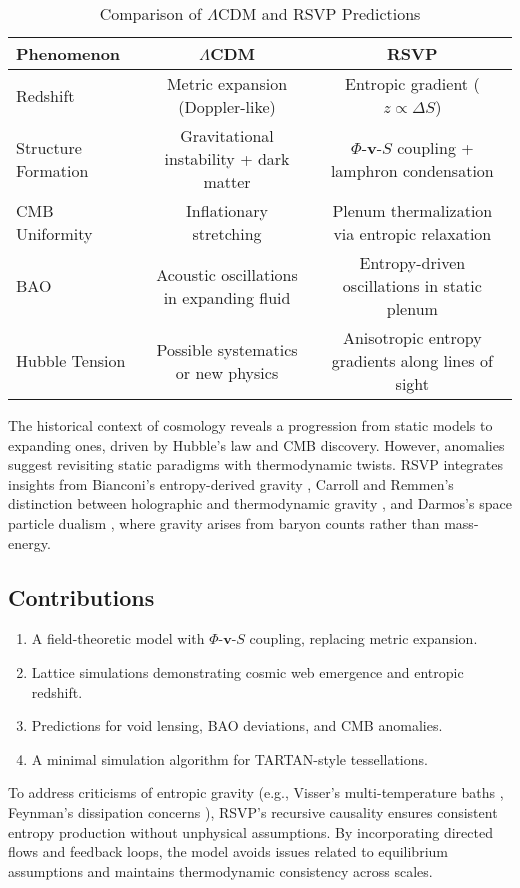 \documentclass[11pt]{article}
\theoremstyle{plain}
\theoremstyle{definition}
\begin{document}
\begin{table}[ht]
\centering
\caption{Comparison of $\Lambda$CDM and RSVP Predictions}
\label{tab:comparison}
\begin{tabular}{lcc}
\toprule
Phenomenon & $\Lambda$CDM & RSVP \\
\midrule
Redshift & Metric expansion (Doppler-like) & Entropic gradient ($z \propto \Delta S$) \\
Structure Formation & Gravitational instability + dark matter & $\Phi$-$\bm{v}$-$S$ coupling + lamphron condensation \\
CMB Uniformity & Inflationary stretching & Plenum thermalization via entropic relaxation \\
BAO & Acoustic oscillations in expanding fluid & Entropy-driven oscillations in static plenum \\
Hubble Tension & Possible systematics or new physics & Anisotropic entropy gradients along lines of sight \\
\bottomrule
\end{tabular}
\end{table}
The historical context of cosmology reveals a progression from static models to expanding ones, driven by Hubble's law and CMB discovery. However, anomalies suggest revisiting static paradigms with thermodynamic twists. RSVP integrates insights from Bianconi's entropy-derived gravity \citep{Bianconi2025}, Carroll and Remmen's distinction between holographic and thermodynamic gravity \citep{CarrollRemmen2016}, and Darmos's space particle dualism \citep{Darmos2021}, where gravity arises from baryon counts rather than mass-energy.
\subsection{Contributions}
\begin{enumerate}
    \item A field-theoretic model with $\Phi$-$\bm{v}$-$S$ coupling, replacing metric expansion.
    \item Lattice simulations demonstrating cosmic web emergence and entropic redshift.
    \item Predictions for void lensing, BAO deviations, and CMB anomalies.
    \item A minimal simulation algorithm for TARTAN-style tessellations.
\end{enumerate}
To address criticisms of entropic gravity (e.g., Visser's multi-temperature baths \citep{Visser2011}, Feynman's dissipation concerns \citep{Feynman1964}), RSVP's recursive causality ensures consistent entropy production without unphysical assumptions. By incorporating directed flows and feedback loops, the model avoids issues related to equilibrium assumptions and maintains thermodynamic consistency across scales.
\end{document}
